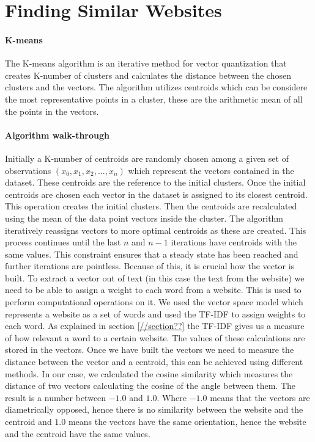 \section{Finding Similar Websites}
\paragraph{K-means}
The K-means algorithm is an iterative method for vector quantization that creates K-number of clusters and calculates the distance between the chosen clusters and the vectors. 
The algorithm utilizes centroids which can be considere the most representative points in a cluster, these are the arithmetic mean of all the points in the vectors.
\paragraph{Algorithm walk-through}
Initially a K-number of centroids are randomly chosen among a given set of observations $(x_0,x_1,x_2,...,x_n)$ which represent the vectors contained in the dataset. These centroids are the reference to the initial clusters. Once the initial centroids are chosen each vector in the dataset is assigned to its closest centroid. This operation creates the initial clusters. Then the centroids are recalculated using the mean of the data point vectors inside the cluster. 
The algorithm iteratively reassigns vectors to more optimal centroids as these are created.
This process continues until the last $n$ and $n-1$ iterations have centroids with the same values. 
This constraint ensures that a steady state has been reached and further iterations are pointless.
Because of this, it is crucial how the vector is built. To extract a vector out of text (in this case the text from the website) we need to be able to assign a weight to each word from a website. This is used to perform computational operations on it. We used the vector space model which represents a website as a set of words and used the TF-IDF to assign weights to each word. As explained in section \ref{//section??} the TF-IDF gives us a measure of how  relevant a word to a certain website. The values of these calculations are stored in the vectors.
Once we have built the vectors we need to measure the distance between the vector and a centroid, this can be achieved using different methods. In our case, we calculated the cosine similarity which measures the distance of two vectors calculating the cosine of the angle between them. The result is a number between $-1.0$ and $1.0$. Where $-1.0$ means that the vectors are diametrically opposed, hence there is no similarity between the website and the centroid and $1.0$ means the vectors have the same orientation, hence the website and the centroid have the same values.
